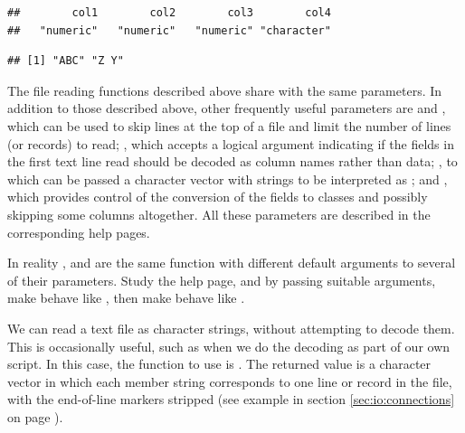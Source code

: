 \documentclass[krantz2]{krantz}\usepackage{knitr}
\begin{document}
\begin{knitrout}\footnotesize
{}\color{fgcolor}\begin{kframe}
\begin{alltt}
\end{alltt}
\begin{verbatim}
##        col1        col2        col3        col4 
##   "numeric"   "numeric"   "numeric" "character"
\end{verbatim}
\begin{alltt}
\hlstd{from_fwf_a.df[[}\hlstd{]]}
\end{alltt}
\begin{verbatim}
## [1] "ABC" "Z Y"
\end{verbatim}
\end{kframe}
\end{knitrout}

\begin{explainbox}
  The file reading functions described above share with  the same parameters. In addition to those described above, other frequently useful parameters are  and , which can be used to skip lines at the top of a file and limit the number of lines (or records) to read; , which accepts a logical argument indicating if the fields in the first text line read should be decoded as column names rather than data; , to which can be passed a character vector with strings to be interpreted as ; and , which provides control of the conversion of the fields to \Rlang classes and possibly skipping some columns altogether. All these parameters are described in the corresponding help pages.
\end{explainbox}

\begin{playground}
In reality  ,  and  are the same function with different default arguments to several of their parameters. Study the help page, and by passing suitable arguments, make  behave like , then make  behave like .
\end{playground}

\begin{explainbox}
We can read a text file as character strings, without attempting to decode them. This is occasionally useful, such as when we do the decoding as part of our own script. In this case, the function to use is . The returned value is a character vector in which each member string corresponds to one line or record in the file, with the end-of-line markers stripped (see example in section \ref{sec:io:connections} on page \pageref{sec:io:connections}).
\end{explainbox}
\end{document}
